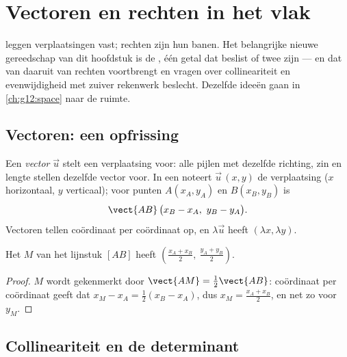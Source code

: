 \chapter{Vectoren en rechten in het vlak}\label{ch:g11:vect}

 leggen verplaatsingen vast; rechten zijn hun banen. Het belangrijke
nieuwe gereedschap van dit hoofdstuk is de \emph{}, één getal dat
beslist of twee   zijn --- en dat van daaruit 
van rechten voortbrengt en vragen over collineariteit en evenwijdigheid met
zuiver rekenwerk beslecht. Dezelfde ideeën gaan in \cref{ch:g12:space} naar de
ruimte.

\section{Vectoren: een opfrissing}

\begin{definition}\label{def:g11:vect:vector}
Een \emph{vector} $\vec u$ stelt een verplaatsing voor: alle
pijlen met dezelfde richting, zin en lengte stellen dezelfde vector voor. In
een  noteert $\vec u\,(x, y)$ de verplaatsing ($x$ horizontaal,
$y$ verticaal); voor punten $A(x_A, y_A)$ en $B(x_B, y_B)$ is
\[
\vect{AB}\,\bigl(x_B - x_A,\ y_B - y_A\bigr).
\]
Vectoren tellen coördinaat per coördinaat op, en $\lambda\vec u$ heeft
 $(\lambda x, \lambda y)$.
\end{definition}

\begin{proposition}[Midden]\label{prop:g11:vect:midpoint}
Het  $M$ van het lijnstuk $[AB]$ heeft 
$\left(\frac{x_A + x_B}{2},\ \frac{y_A + y_B}{2}\right)$.
\end{proposition}

\begin{proof}
$M$ wordt gekenmerkt door $\vect{AM} = \frac12\vect{AB}$: coördinaat per
coördinaat geeft dat $x_M - x_A = \frac12(x_B - x_A)$, dus
$x_M = \frac{x_A + x_B}{2}$, en net zo voor $y_M$.
\end{proof}

\section{Collineariteit en de determinant}

